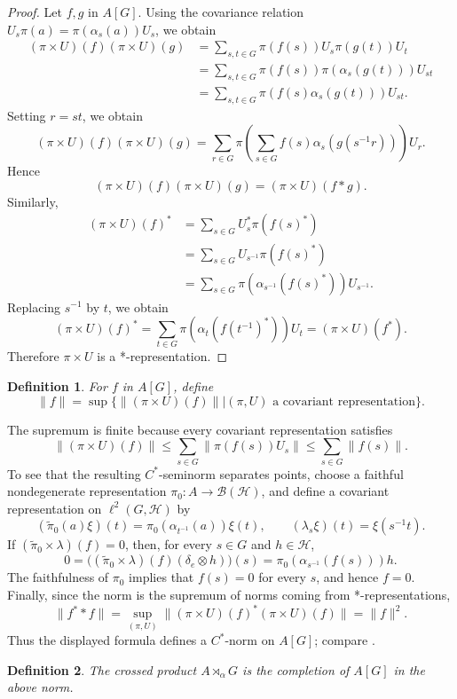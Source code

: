 \documentclass{book}
\newtheorem{definition}{Definition}[section]
\begin{document}
\begin{proof}
  Let \(f,g\) in \(A[G]\).
  Using the covariance relation
  \(U_s\pi(a)=\pi(\alpha_s(a))U_s\),
  we obtain
  \begin{align*}
  (\pi\times U)(f)(\pi\times U)(g)
  &=
  \sum_{s,t\in G}
  \pi(f(s))U_s\pi(g(t))U_t\\
  &=
  \sum_{s,t\in G}
  \pi(f(s))
  \pi(\alpha_s(g(t)))
  U_{st}\\
  &=
  \sum_{s,t\in G}
  \pi(f(s)\alpha_s(g(t)))
  U_{st}.
  \end{align*}
  Setting \(r=st\), we obtain
  \[
  (\pi\times U)(f)(\pi\times U)(g)
  =
  \sum_{r\in G}
  \pi\!\left(
  \sum_{s\in G}
  f(s)\alpha_s(g(s^{-1}r))
  \right)
  U_r.
  \]
  Hence
  \[
  (\pi\times U)(f)(\pi\times U)(g)
  =
  (\pi\times U)(f*g).
  \]
  Similarly,
  \begin{align*}
  (\pi\times U)(f)^*
  &=
  \sum_{s\in G}
  U_s^*\pi(f(s)^*)\\
  &=
  \sum_{s\in G}
  U_{s^{-1}}\pi(f(s)^*)\\
  &=
  \sum_{s\in G}
  \pi(\alpha_{s^{-1}}(f(s)^*))U_{s^{-1}}.
  \end{align*}
  Replacing \(s^{-1}\) by \(t\), we obtain
  \[
  (\pi\times U)(f)^*
  =
  \sum_{t\in G}
  \pi(\alpha_t(f(t^{-1})^*))U_t
  =
  (\pi\times U)(f^*).
  \]
  Therefore \(\pi\times U\) is a *-representation.
\end{proof}
\begin{definition}
  For \(f\) in \(A[G]\), define
  \[
  \|f\|
  =
  \sup\{\|(\pi\times U)(f)\| |
  (\pi,U)\mbox{ a covariant representation}\}.\]
\end{definition}
The supremum is finite because every covariant representation satisfies
\[
  \|(\pi\times U)(f)\|
  \leq\sum_{s\in G}\|\pi(f(s))U_s\|
  \leq\sum_{s\in G}\|f(s)\|.
\]
To see that the resulting \(C^*\)-seminorm separates points, choose a faithful nondegenerate representation
\(\pi_0:A\rightarrow\mathcal{B}(\mathcal{H})\), and define a covariant representation on \(\ell^2(G,\mathcal{H})\) by
\[
  (\widetilde{\pi}_0(a)\xi)(t)=\pi_0(\alpha_{t^{-1}}(a))\xi(t),
  \qquad
  (\lambda_s\xi)(t)=\xi(s^{-1}t).
\]
If \((\widetilde{\pi}_0\times\lambda)(f)=0\), then, for every \(s\in G\) and \(h\in\mathcal{H}\),
\[
  0=\bigl((\widetilde{\pi}_0\times\lambda)(f)(\delta_e\otimes h)\bigr)(s)
   =\pi_0(\alpha_{s^{-1}}(f(s)))h.
\]
The faithfulness of \(\pi_0\) implies that \(f(s)=0\) for every \(s\), and hence \(f=0\). Finally, since the norm is the supremum
of norms coming from *-representations,
\[
  \|f^* * f\|=\sup_{(\pi,U)}\|(\pi\times U)(f)^*(\pi\times U)(f)\|=\|f\|^2.
\]
Thus the displayed formula defines a \(C^*\)-norm on \(A[G]\); compare \cite[Lemma 2.27]{Williams2007}.
\begin{definition}
  The \textnormal{crossed product} \(A\rtimes_\alpha G\) is the completion of \(A[G]\) in the above norm.
\end{definition}
\end{document}
